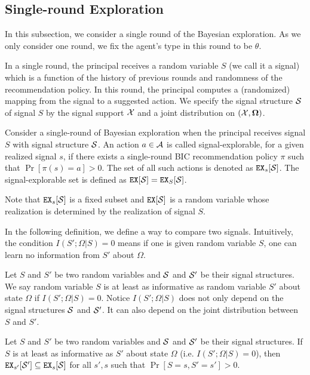 \subsection{Single-round Exploration}
\label{sec:public_single}

In this subsection, we consider a single round of the Bayesian exploration. As we only consider one round, we fix the agent's type in this round to be $\theta$. 

In a single round, the principal receives a random variable $S$ (we call it a signal) which is a function of the history of previous rounds and randomness of the recommendation policy. In this round, the principal computes a (randomized) mapping from the signal to a suggested action. We specify the signal structure $\S$ of signal $S$ by the signal support $\X$ and a joint distribution on $(\X, \varOmega)$.  


\begin{definition}
Consider a single-round of Bayesian exploration when the principal receives signal $S$ with signal structure $\S$. An action $a \in \A$ is called signal-explorable, for a given realized signal $s$, if there exists a single-round BIC recommendation policy $\pi$ such that $\Pr[\pi(s) = a] > 0$. The set of all such actions is denoted as $\EX_s[\S]$. The signal-explorable set is defined as $\EX[\S] = \EX_S[\S]$.
\end{definition}

Note that $\EX_s[\S]$ is a fixed subset and $\EX[\S]$ is a random variable whose realization is determined by the realization of signal $S$.

In the following definition, we define a way to compare two signals. Intuitively, the condition $I(S';\Omega|S)= 0$  means if one is given random variable $S$, one can learn no information from $S'$ about $\Omega$. 
\begin{definition}
Let $S$ and $S'$ be two random variables and $\S$ and $\S'$ be their signal structures. We say random variable $S$ is at least as informative as random variable $S'$ about state $\Omega$ if $I(S' ; \Omega|S) = 0$. Notice $I(S';\Omega|S)$ does not only depend on the signal structures $\S$ and $\S'$. It can also depend on the joint distribution between $S$ and $S'$.
\end{definition}

\begin{lemma}
\label{lem:infomono}
Let $S$ and $S'$ be two random variables and $\S$ and $\S'$ be their signal structures. If $S$ is at least as informative as $S'$ about state $\Omega$ (i.e. $I(S' ; \Omega|S) = 0$), then $\EX_{s'}[\S'] \subseteq \EX_s[\S]$ for all $s' ,s$ such that $\Pr[S= s, S'= s'] > 0$.
\end{lemma}

